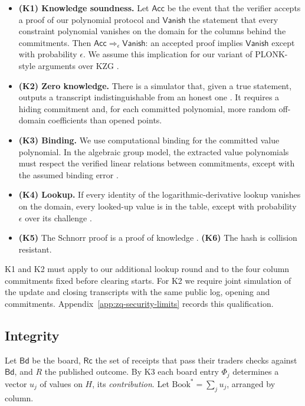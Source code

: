 \begin{itemize}
\item
  \textbf{(K1) Knowledge soundness.} Let \(\mathsf{Acc}\) be the event that the verifier accepts a proof of our polynomial protocol and \(\mathsf{Vanish}\) the statement that every constraint polynomial vanishes on the domain for the columns behind the commitments. Then \(\mathsf{Acc} \Rightarrow_\epsilon \mathsf{Vanish}\): an accepted proof implies \(\mathsf{Vanish}\) except with probability \(\epsilon\). We assume this implication for our variant of PLONK-style arguments over KZG \cite{CHM+20,GWC19}.
\item
  \textbf{(K2) Zero knowledge.} There is a simulator that, given a true statement, outputs a transcript indistinguishable from an honest one \cite{Lip25,Sef24}. It requires a hiding commitment and, for each committed polynomial, more random off-domain coefficients than opened points.
\item
  \textbf{(K3) Binding.} We use computational binding for the committed value polynomial. In the algebraic group model, the extracted value polynomials must respect the verified linear relations between commitments, except with the assumed binding error \cite{KZG10}.
\item
  \textbf{(K4) Lookup.} If every identity of the logarithmic-derivative lookup vanishes on the domain, every looked-up value is in the table, except with probability \(\epsilon\) over its challenge \cite{habock2022}.
\item
  \textbf{(K5)} The Schnorr proof is a proof of knowledge \cite{Sch91}. \textbf{(K6)} The hash is collision resistant.
\end{itemize}

K1 and K2 must apply to our additional lookup round and to the four column commitments fixed before clearing starts. For K2 we require joint simulation of the update and closing transcripts with the same public log, opening and commitments. Appendix~\ref{app:zq-security-limits} records this qualification.

\subsection{Integrity}

Let \(\mathsf{Bd}\) be the board, \(\mathsf{Rc}\) the set of receipts that pass their traders\textquotesingle{} checks against \(\mathsf{Bd}\), and \(R\) the published outcome. By K3 each board entry \(\Phi_j\) determines a vector \(u_j\) of values on \(H\), its \emph{contribution}. Let \(\text{Book}^* = \sum_j u_j\), arranged by column.

